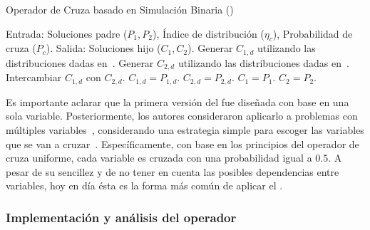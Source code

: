 \begin{algorithm}[t]
\scriptsize
\caption{Operador de Cruza basado en Simulación Binaria (\SBX{})}
\label{alg:SBX_Operator}
\begin{algorithmic}[1]
    \STATE Entrada: Soluciones padre ($P_{1}, P_{2}$), Índice de distribución ($\eta_c$), Probabilidad de cruza ($P_c$).
    \STATE Salida: Soluciones hijo ($C_{1}, C_{2}$).
	 \label{alg:inherit_variable}
		\STATE Generar $C_{1,d}$ utilizando las distribuciones dadas en~\cite{deb1999self}. 
		\STATE Generar $C_{2,d}$ utilizando las distribuciones dadas en~\cite{deb1999self}.
			\STATE Intercambiar $C_{1,d}$ con $C_{2,d}$.
		 \ENDIF
        \ELSE
	   \STATE $C_{1,d} = P_{1, d}$.
	   \STATE $C_{2,d} = P_{2, d}$.
        \ENDIF
       \ENDFOR
    \ELSE
	\STATE $C_{1} = P_{1}$.
	\STATE $C_{2} = P_{2}$.
    \ENDIF
\end{algorithmic}
\end{algorithm}

Es importante aclarar que la primera versión del \SBX{} fue diseñada con base en una sola variable.
%
Posteriormente, los autores consideraron aplicarlo a problemas con múltiples variables~\cite{Joel:SBX1994}, considerando
una estrategia simple para escoger las variables que se van a cruzar~\cite{Joel:UNDX}.
%
Específicamente, con base en los principios del operador de cruza uniforme, cada variable es cruzada con una probabilidad igual a $0.5$.
%
A pesar de su sencillez y de no tener en cuenta las posibles dependencias entre variables, hoy en día ésta es la forma más común de 
aplicar el \SBX{}.

\subsubsection{Implementación y análisis del operador \SBX{}}

